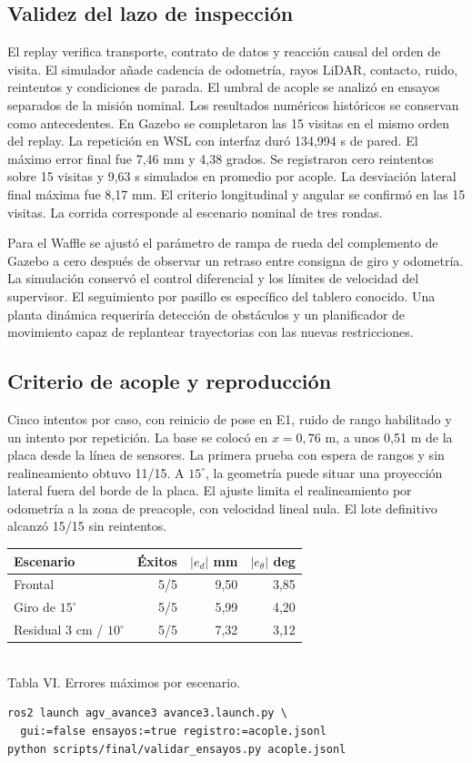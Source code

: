 \documentclass[conference,letterpaper]{IEEEtran}
\begin{document}
\subsection{Validez del lazo de inspección}
El replay verifica transporte, contrato de datos y reacción causal del orden de visita. El simulador añade cadencia de odometría, rayos LiDAR, contacto, ruido, reintentos y condiciones de parada. El umbral de acople se analizó en ensayos separados de la misión nominal. Los resultados numéricos históricos se conservan como antecedentes. En Gazebo se completaron las 15 visitas en el mismo orden del replay. La repetición en WSL con interfaz duró 134,994 s de pared. El máximo error final fue 7,46 mm y 4,38 grados. Se registraron cero reintentos sobre 15 visitas y 9,63 s simulados en promedio por acople. La desviación lateral final máxima fue 8,17 mm. El criterio longitudinal y angular se confirmó en las 15 visitas. La corrida corresponde al escenario nominal de tres rondas.

Para el Waffle se ajustó el parámetro de rampa de rueda del complemento de Gazebo a cero después de observar un retraso entre consigna de giro y odometría. La simulación conservó el control diferencial y los límites de velocidad del supervisor. El seguimiento por pasillo es específico del tablero conocido. Una planta dinámica requeriría detección de obstáculos y un planificador de movimiento capaz de replantear trayectorias con las nuevas restricciones.
\subsection{Criterio de acople y reproducción}
Cinco intentos por caso, con reinicio de pose en E1, ruido de rango habilitado y un intento por repetición. La base se colocó en $x=0{,}76$ m, a unos 0,51 m de la placa desde la línea de sensores. La primera prueba con espera de rangos y sin realineamiento obtuvo 11/15. A $15^\circ$, la geometría puede situar una proyección lateral fuera del borde de la placa. El ajuste limita el realineamiento por odometría a la zona de preacople, con velocidad lineal nula. El lote definitivo alcanzó 15/15 sin reintentos.
\begin{center}\small
\begin{tabular}{@{}lrrr@{}}
\toprule Escenario & Éxitos & $|e_d|$ mm & $|e_\theta|$ deg\\
\midrule
Frontal & 5/5 & 9,50 & 3,85\\
Giro de $15^\circ$ & 5/5 & 5,99 & 4,20\\
Residual $3$ cm / $10^\circ$ & 5/5 & 7,32 & 3,12\\
\bottomrule
\end{tabular}\\
Tabla VI. Errores máximos por escenario.
\end{center}
\begin{lstlisting}
ros2 launch agv_avance3 avance3.launch.py \
  gui:=false ensayos:=true registro:=acople.jsonl
python scripts/final/validar_ensayos.py acople.jsonl
\end{lstlisting}
\end{document}
